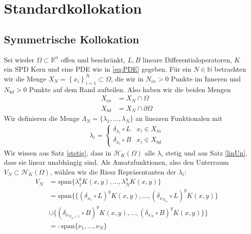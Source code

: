 \chapter{Standardkollokation}
\label{cha:Standardkollokation}

\section{Symmetrische Kollokation}
\label{sec:SymKol}
Sei wieder $\Omega \subset \mathbb{R}^n$ offen und beschränkt, $L,B$ lineare Differentialoperatoren, $K$ ein \gls{SPD} Kern und eine \gls{PDE} wie in \eqref{eq:PDE} gegeben. Für ein $N \in \mathbb{N}$ betrachten wir die Menge $X_N = \left\{ x_i \right\}_{i=1}^N \subset \Omega$, die wir in $N_{in} > 0$ Punkte im Inneren und $N_{bd} > 0$ Punkte auf dem Rand aufteilen. Also haben wir die beiden Mengen
\begin{align*}
X_{in} &= X_N \cap \Omega\\
X_{bd} &= X_N \cap \partial \Omega
\end{align*}
Wir definieren die Menge $\Lambda_N = \{\lambda_1, \dots, \lambda_N\}$ an linearen Funktionalen mit
\begin{align*}
\lambda_i =
\begin{cases}
\delta_{x_i} \circ L & x_i \in X_{in}\\
\delta_{x_i} \circ B & x_i \in X_{bd}
\end{cases}
\end{align*}
Wir wissen aus Satz \ref{stetig}, dass in $\mathcal{H}_K(\Omega)$ alle $\lambda_i$ stetig und aus Satz \ref{linUn}, dass sie linear unabhängig sind. Als Ansatzfunktionen, also den Unterraum $V_N \subset \mathcal{H}_K(\Omega)$, wählen wir die Riesz Repräsentanten der $\lambda_i$:
\begin{align*}
V_N &= \text{span} \{\lambda_1^y K(x,y), \dots , \lambda_N^y K(x,y)\}\\
&= \text{span} \{\{(\delta_{x_1} \circ L)^y K(x,y), \dots, (\delta_{x_{N_{in}}} \circ L)^y K(x,y)\}\\
&\cup \{ (\delta_{x_{N_{in} + 1}} \circ B)^y K(x,y), \dots, (\delta_{x_{N}} \circ B)^y K(x,y)\}\}\\
&=: \text{span} \{\nu_1, \dots, \nu_N\}
\end{align*}

